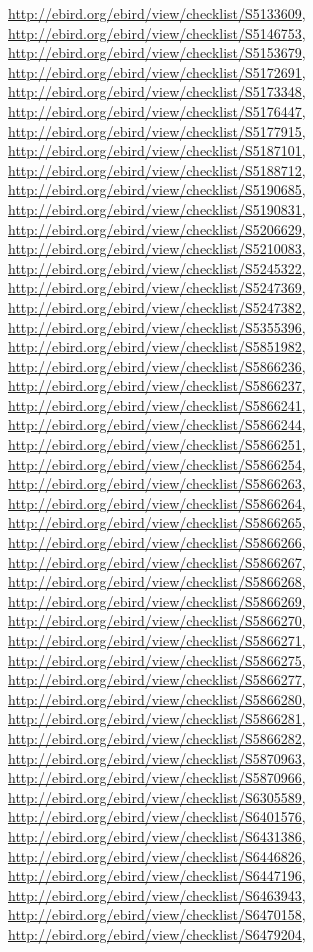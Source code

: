 \documentclass[9pt, article]{memoir}
\begin{document}
\begin{multicols}{2}
\url{http://ebird.org/ebird/view/checklist/S5133609}, 
\url{http://ebird.org/ebird/view/checklist/S5146753}, 
\url{http://ebird.org/ebird/view/checklist/S5153679}, 
\url{http://ebird.org/ebird/view/checklist/S5172691}, 
\url{http://ebird.org/ebird/view/checklist/S5173348}, 
\url{http://ebird.org/ebird/view/checklist/S5176447}, 
\url{http://ebird.org/ebird/view/checklist/S5177915}, 
\url{http://ebird.org/ebird/view/checklist/S5187101}, 
\url{http://ebird.org/ebird/view/checklist/S5188712}, 
\url{http://ebird.org/ebird/view/checklist/S5190685}, 
\url{http://ebird.org/ebird/view/checklist/S5190831}, 
\url{http://ebird.org/ebird/view/checklist/S5206629}, 
\url{http://ebird.org/ebird/view/checklist/S5210083}, 
\url{http://ebird.org/ebird/view/checklist/S5245322}, 
\url{http://ebird.org/ebird/view/checklist/S5247369}, 
\url{http://ebird.org/ebird/view/checklist/S5247382}, 
\url{http://ebird.org/ebird/view/checklist/S5355396}, 
\url{http://ebird.org/ebird/view/checklist/S5851982}, 
\url{http://ebird.org/ebird/view/checklist/S5866236}, 
\url{http://ebird.org/ebird/view/checklist/S5866237}, 
\url{http://ebird.org/ebird/view/checklist/S5866241}, 
\url{http://ebird.org/ebird/view/checklist/S5866244}, 
\url{http://ebird.org/ebird/view/checklist/S5866251}, 
\url{http://ebird.org/ebird/view/checklist/S5866254}, 
\url{http://ebird.org/ebird/view/checklist/S5866263}, 
\url{http://ebird.org/ebird/view/checklist/S5866264}, 
\url{http://ebird.org/ebird/view/checklist/S5866265}, 
\url{http://ebird.org/ebird/view/checklist/S5866266}, 
\url{http://ebird.org/ebird/view/checklist/S5866267}, 
\url{http://ebird.org/ebird/view/checklist/S5866268}, 
\url{http://ebird.org/ebird/view/checklist/S5866269}, 
\url{http://ebird.org/ebird/view/checklist/S5866270}, 
\url{http://ebird.org/ebird/view/checklist/S5866271}, 
\url{http://ebird.org/ebird/view/checklist/S5866275}, 
\url{http://ebird.org/ebird/view/checklist/S5866277}, 
\url{http://ebird.org/ebird/view/checklist/S5866280}, 
\url{http://ebird.org/ebird/view/checklist/S5866281}, 
\url{http://ebird.org/ebird/view/checklist/S5866282}, 
\url{http://ebird.org/ebird/view/checklist/S5870963}, 
\url{http://ebird.org/ebird/view/checklist/S5870966}, 
\url{http://ebird.org/ebird/view/checklist/S6305589}, 
\url{http://ebird.org/ebird/view/checklist/S6401576}, 
\url{http://ebird.org/ebird/view/checklist/S6431386}, 
\url{http://ebird.org/ebird/view/checklist/S6446826}, 
\url{http://ebird.org/ebird/view/checklist/S6447196}, 
\url{http://ebird.org/ebird/view/checklist/S6463943}, 
\url{http://ebird.org/ebird/view/checklist/S6470158}, 
\url{http://ebird.org/ebird/view/checklist/S6479204}, 

\end{multicols}
\end{document}
